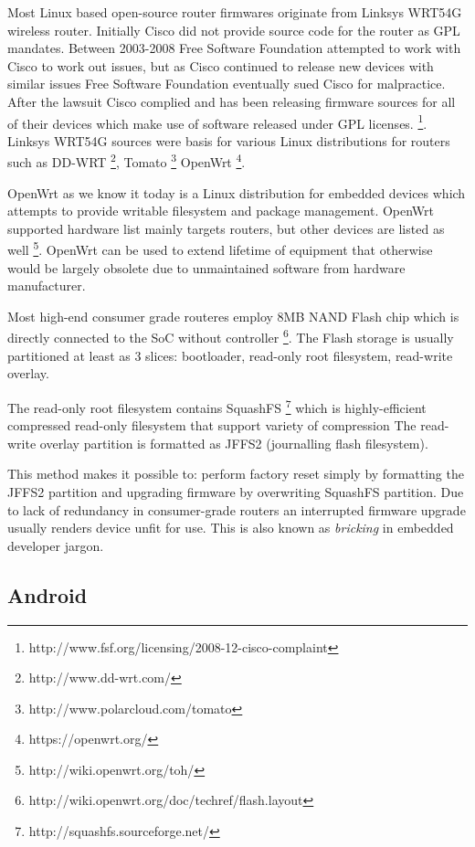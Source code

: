 \documentclass{article}
\begin{document}
Most Linux based open-source router firmwares originate from Linksys WRT54G
wireless router.
Initially Cisco did not provide source code for the router as GPL mandates.
Between 2003-2008 Free Software Foundation attempted to work with Cisco
to work out issues, but as Cisco continued to release new devices with similar
issues Free Software Foundation eventually sued Cisco for malpractice.
After the lawsuit Cisco complied and has been releasing firmware sources for
all of their devices which make use of software released under GPL licenses.
\footnote{http://www.fsf.org/licensing/2008-12-cisco-complaint}.
Linksys WRT54G sources were basis for various Linux distributions for routers such as
DD-WRT \footnote{http://www.dd-wrt.com/},
Tomato \footnote{http://www.polarcloud.com/tomato}
OpenWrt \footnote{https://openwrt.org/}.

OpenWrt as we know it today is a Linux distribution for embedded devices
which attempts to provide writable filesystem and package management.
OpenWrt supported hardware list mainly targets routers, but other devices are
listed as well \footnote{http://wiki.openwrt.org/toh/}. OpenWrt can be used to
extend lifetime of equipment that otherwise would be largely obsolete due
to unmaintained software from hardware manufacturer.

Most high-end consumer grade routeres employ 8MB NAND Flash chip which is
directly connected to the SoC without controller
\footnote{http://wiki.openwrt.org/doc/techref/flash.layout}.
The Flash storage is usually partitioned at least as 3 slices:
bootloader, read-only root filesystem, read-write overlay.

The read-only root filesystem contains SquashFS
\footnote{http://squashfs.sourceforge.net/}
which is highly-efficient compressed read-only filesystem that support variety
of compression The read-write overlay partition is formatted as JFFS2
(journalling flash filesystem).

This method makes it possible to: perform factory reset simply by formatting
the JFFS2 partition and upgrading firmware by overwriting SquashFS partition.
Due to lack of redundancy in consumer-grade routers an interrupted firmware
upgrade usually renders device unfit for use. This is also known as
\emph{bricking} in embedded developer jargon.


\subsection{Android}
\end{document}
